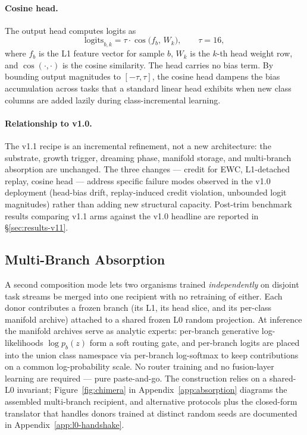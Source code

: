 \documentclass[11pt]{article}
\begin{document}
\paragraph{Cosine head.}
The output head computes logits as
\begin{equation}
  \text{logits}_{b,k} = \tau \cdot \cos\!\bigl(f_{b},\, W_k\bigr),
  \qquad \tau = 16,
\end{equation}
where $f_b$ is the L1 feature vector for sample $b$, $W_k$ is the
$k$-th head weight row, and $\cos(\cdot, \cdot)$ is the cosine
similarity. The head carries no bias term. By bounding output
magnitudes to $[-\tau, \tau]$, the cosine head dampens the bias
accumulation across tasks that a standard linear head exhibits
when new class columns are added lazily during class-incremental
learning.

\paragraph{Relationship to v1.0.}
The v1.1 recipe is an incremental refinement, not a new
architecture: the substrate, growth trigger, dreaming phase,
manifold storage, and multi-branch absorption are unchanged. The
three changes --- credit for EWC, L1-detached replay, cosine head
--- address specific failure modes observed in the v1.0 deployment
(head-bias drift, replay-induced credit violation, unbounded logit
magnitudes) rather than adding new structural capacity. Post-trim
benchmark results comparing v1.1 arms against the v1.0 headline
are reported in \S\ref{sec:results-v11}.

\subsection{Multi-Branch Absorption}
\label{sec:methods-absorption}

A second composition mode lets two organisms trained
\emph{independently} on disjoint task streams be merged into one
recipient with no retraining of either. Each donor contributes a
frozen branch (its L1, its head slice, and its per-class manifold
archive) attached to a shared frozen L0 random projection. At
inference the manifold archives serve as analytic experts: per-branch
generative log-likelihoods $\log p_b(z)$ form a soft routing gate, and
per-branch logits are placed into the union class namespace via
per-branch log-softmax to keep contributions on a common
log-probability scale. No router training and no fusion-layer
learning are required --- pure paste-and-go. The construction relies
on a shared-L0 invariant; Figure~\ref{fig:chimera} in
Appendix~\ref{app:absorption} diagrams the assembled multi-branch
recipient, and alternative protocols plus the closed-form translator
that handles donors trained at distinct random seeds are documented
in Appendix~\ref{app:l0-handshake}.
\end{document}
